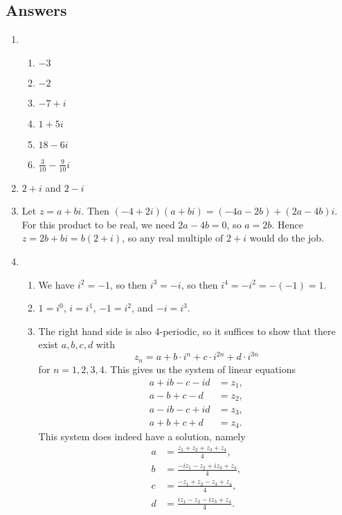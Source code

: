 \newpage
\subsection{Answers}

\begin{enumerate}
\item \begin{enumerate}
\item $-3$
\item $-2$
\item $-7 + i$
\item $1 + 5i$
\item $18 - 6i$
\item $\frac{3}{10} - \frac{9}{10}i$
\end{enumerate}
\item $2 + i$ and $2 - i$
\item Let $z = a + bi$. Then $(-4 + 2i)(a + bi) = (-4a - 2b) + (2a - 4b)i$. For this product to be real, we need $2a - 4b = 0$, so $a = 2b$. Hence $z = 2b + bi = b(2 + i)$, so $\boxed{\text{any real multiple of }2 + i}$ would do the job.
\item \begin{enumerate}
\item We have $i^2 = -1$, so then $i^3 = -i$, so then $i^4 = -i^2 = -(-1) = 1$.
\item $1 = i^0$, $i = i^1$, $-1 = i^2$, and $-i = i^3$.
\item The right hand side is also 4-periodic, so it suffices to show that there exist $a,b,c,d$ with
\begin{equation*}
z_n = a + b\cdot i^n + c\cdot i^{2n} + d\cdot i^{3n}
\end{equation*}
for $n = 1, 2, 3, 4$. This gives us the system of linear equations
\begin{align*}
a + ib - c - id &= z_1, \\
a - b + c - d &= z_2, \\
a - ib - c + id &= z_3, \\
a + b + c + d &= z_4.
\end{align*}
This system does indeed have a solution, namely
\begin{align*}
a &= \frac{z_1 + z_2 + z_3 + z_4}{4}, \\
b &= \frac{-iz_1 - z_2 + iz_3 + z_4}{4}, \\
c &= \frac{-z_1 + z_2 - z_3 + z_4}{4}, \\
d &= \frac{iz_1 - z_2 - iz_3 + z_4}{4}.
\end{align*}

\end{enumerate}
\end{enumerate}
